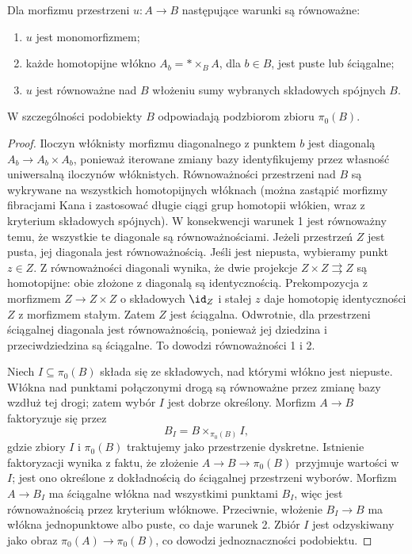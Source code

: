 \begin{stwierdzenie}\label{cat:prop:infty-space-subobjects}
Dla morfizmu przestrzeni $u:A\to B$ następujące warunki są równoważne:
\begin{enumerate}
 \item $u$ jest monomorfizmem;
 \item każde homotopijne włókno $A_b=*\times_B A$, dla $b\in B$, jest puste lub ściągalne;
 \item $u$ jest równoważne nad $B$ włożeniu sumy wybranych składowych spójnych $B$.
\end{enumerate}
W szczególności podobiekty $B$ odpowiadają podzbiorom zbioru $\pi_0(B)$.
\end{stwierdzenie}
\begin{proof}
Iloczyn włóknisty morfizmu diagonalnego z punktem $b$ jest diagonalą $A_b\to A_b\times A_b$, ponieważ iterowane zmiany bazy identyfikujemy przez własność uniwersalną iloczynów włóknistych. Równoważności przestrzeni nad $B$ są wykrywane na wszystkich homotopijnych włóknach (można zastąpić morfizmy fibracjami Kana i zastosować długie ciągi grup homotopii włókien, wraz z kryterium składowych spójnych). W konsekwencji warunek 1 jest równoważny temu, że wszystkie te diagonale są równoważnościami. Jeżeli przestrzeń $Z$ jest pusta, jej diagonala jest równoważnością. Jeśli jest niepusta, wybieramy punkt $z\in Z$. Z równoważności diagonali wynika, że dwie projekcje $Z\times Z\rightrightarrows Z$ są homotopijne: obie złożone z diagonalą są identycznością. Prekompozycja z morfizmem $Z\to Z\times Z$ o składowych $\id_Z$ i stałej $z$ daje homotopię identyczności $Z$ z morfizmem stałym. Zatem $Z$ jest ściągalna. Odwrotnie, dla przestrzeni ściągalnej diagonala jest równoważnością, ponieważ jej dziedzina i przeciwdziedzina są ściągalne. To dowodzi równoważności 1 i 2.

Niech $I\subseteq\pi_0(B)$ składa się ze składowych, nad którymi włókno jest niepuste. Włókna nad punktami połączonymi drogą są równoważne przez zmianę bazy wzdłuż tej drogi; zatem wybór $I$ jest dobrze określony. Morfizm $A\to B$ faktoryzuje się przez
\[
 B_I=B\times_{\pi_0(B)}I,
\]
gdzie zbiory $I$ i $\pi_0(B)$ traktujemy jako przestrzenie dyskretne. Istnienie faktoryzacji wynika z faktu, że złożenie $A\to B\to\pi_0(B)$ przyjmuje wartości w $I$; jest ono określone z dokładnością do ściągalnej przestrzeni wyborów. Morfizm $A\to B_I$ ma ściągalne włókna nad wszystkimi punktami $B_I$, więc jest równoważnością przez kryterium włóknowe. Przeciwnie, włożenie $B_I\to B$ ma włókna jednopunktowe albo puste, co daje warunek 2. Zbiór $I$ jest odzyskiwany jako obraz $\pi_0(A)\to\pi_0(B)$, co dowodzi jednoznaczności podobiektu.
\end{proof}


